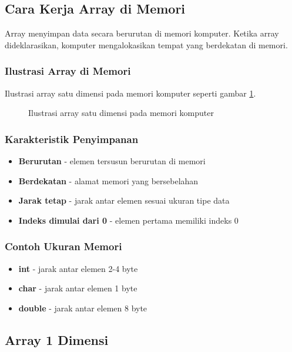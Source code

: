 \subsection{Cara Kerja Array di Memori}

Array menyimpan data secara berurutan di memori komputer. Ketika array dideklarasikan, komputer mengalokasikan tempat yang berdekatan di memori.

\subsubsection{Ilustrasi Array di Memori}

Ilustrasi array satu dimensi pada memori komputer seperti gambar \ref{gambar3-1}.

\begin{figure}[htbp]
\centering
{}
\label{gambar3-1}
\caption{Ilustrasi array satu dimensi pada memori komputer}
\end{figure}

\subsubsection{Karakteristik Penyimpanan}

\begin{itemize}
\item \textbf{Berurutan} - elemen tersusun berurutan di memori
\item \textbf{Berdekatan} - alamat memori yang bersebelahan
\item \textbf{Jarak tetap} - jarak antar elemen sesuai ukuran tipe data
\item \textbf{Indeks dimulai dari 0} - elemen pertama memiliki indeks 0
\end{itemize}

\subsubsection{Contoh Ukuran Memori}

\begin{itemize}
\item \textbf{int} - jarak antar elemen 2-4 byte
\item \textbf{char} - jarak antar elemen 1 byte
\item \textbf{double} - jarak antar elemen 8 byte
\end{itemize}

\subsection{Array 1 Dimensi}\label{array-1-dimensi}

